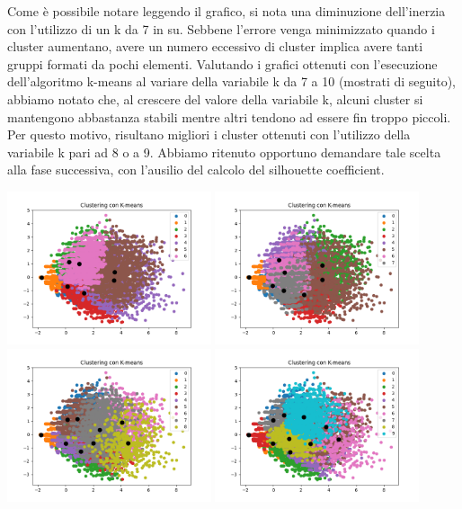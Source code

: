 \documentclass[a4paper, 10pt]{report}
\begin{document}
                Come è possibile notare leggendo il grafico, si nota una diminuzione dell'inerzia con l'utilizzo di un k da 7 in su.
                Sebbene l’errore venga minimizzato quando i cluster aumentano, avere un numero eccessivo di cluster implica avere tanti gruppi
                formati da pochi elementi.
                Valutando i grafici ottenuti con l'esecuzione dell'algoritmo k-means al variare della variabile k da 7 a 10 (mostrati di seguito),
                abbiamo notato che, al crescere del valore della variabile k, alcuni cluster si mantengono abbastanza stabili mentre altri
                tendono ad essere fin troppo piccoli. Per questo motivo, risultano migliori i cluster ottenuti con l'utilizzo
                della variabile k pari ad 8 o a 9. Abbiamo ritenuto opportuno demandare tale scelta alla fase successiva, con l'ausilio del calcolo del silhouette
                coefficient.
                \begin{center}
                    \includegraphics[width=6cm]{evaluation/k=7}
                    \includegraphics[width=6cm]{evaluation/k=8} \\
                    \includegraphics[width=6cm]{evaluation/k=9}
                    \includegraphics[width=6cm]{evaluation/k=10}
                \end{center}
\end{document}
